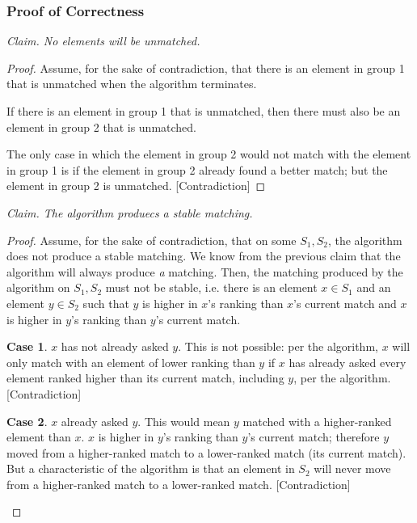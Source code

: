 \documentclass[12pt]{extarticle}
\theoremstyle{definition}
\newtheorem{case}{\textbf{Case}}
\theoremstyle{remark}
\newcommand{\resetcases}[0]{\setcounter{case}{0}}
\begin{document}
\subsubsection*{Proof of Correctness}
\textit{Claim. No elements will be unmatched.}
\begin{proof}
Assume, for the sake of contradiction, that there is an element in group 1 that is unmatched when the algorithm terminates. 

If there is an element in group 1 that is unmatched, then there must also be an element in group 2 that is unmatched.

 The only case in which the element in group 2 would not match with the element in group 1 is if the element in group 2 already found a better match; but the element in group 2 is unmatched. [Contradiction]

\end{proof}

\resetcases
\noindent\textit{Claim. The algorithm produecs a stable matching.}
\begin{proof}
Assume, for the sake of contradiction, that on some $S_1,S_2$, the algorithm does not produce a stable matching. We know from the previous claim that the algorithm will always produce \textit{a} matching. Then, the matching produced by the algorithm on $S_1,S_2$ must not be stable, i.e. there is an element $x\in S_1$ and an element $y\in S_2$ such that $y$ is higher in $x$’s ranking than $x$’s current match and $x$ is higher in $y$’s ranking than $y$’s current match. 

\begin{case}
    $x$ has not already asked $y$. This is not possible: per the algorithm, $x$ will only match with an element of lower ranking than $y$ if $x$ has already asked every element ranked higher than its current match, including $y$, per the algorithm. [Contradiction]
\end{case}

\begin{case}
    $x$ already asked $y$. This would mean $y$ matched with a higher-ranked element than $x$. $x$ is higher in $y$’s ranking than $y$’s current match; therefore $y$ moved from a higher-ranked match to a lower-ranked match (its current match). But a characteristic of the algorithm is that an element in $S_2$ will never move from a higher-ranked match to a lower-ranked match. [Contradiction]
\end{case}
\end{proof}
\end{document}
